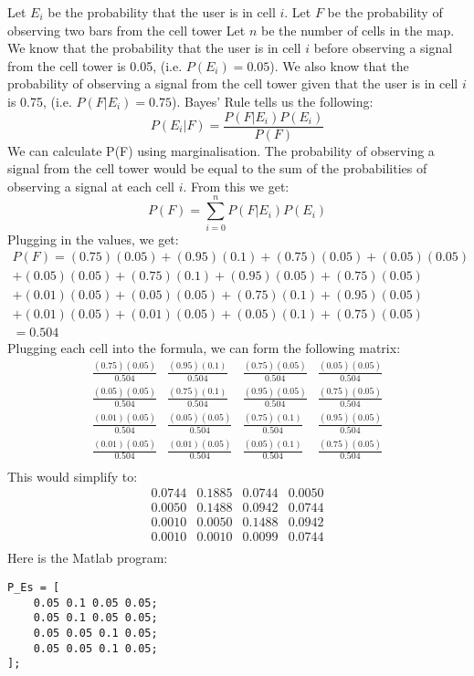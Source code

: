 \documentclass{oxmathproblems}
\begin{document}
\begin{questions}
\miquestion
Let $E_i$ be the probability that the user is in cell $i$.
\newline
Let $F$ be the probability of observing two bars from the cell tower
\newline
Let $n$ be the number of cells in the map.
\newline
\newline
We know that the probability that the user is in cell $i$ before observing a signal from the cell tower is 0.05, (i.e. $P(E_i)=0.05$). We also know that the probability of observing a signal from the cell tower given that the user is in cell $i$ is 0.75, (i.e. $P(F|E_i)=0.75$).
\newline
\newline
Bayes' Rule tells us the following:
$$P(E_i|F)=\frac{P(F|E_i)P(E_i)}{P(F)}$$
We can calculate P(F) using marginalisation. The probability of observing a signal from the cell tower would be equal to the sum of the probabilities of observing a signal at each cell $i$. From this we get:
$$P(F)=\sum_{i=0}^{n}P(F|E_i)P(E_i)$$
\newpage
Plugging in the values, we get:
\begin{align*}
    P(F)=(0.75)(0.05)+(0.95)(0.1)+(0.75)(0.05)+(0.05)(0.05)\\
        +(0.05)(0.05)+(0.75)(0.1)+(0.95)(0.05)+(0.75)(0.05)\\
        +(0.01)(0.05)+(0.05)(0.05)+(0.75)(0.1)+(0.95)(0.05)\\
        +(0.01)(0.05)+(0.01)(0.05)+(0.05)(0.1)+(0.75)(0.05)\\
        =0.504
\end{align*}
Plugging each cell into the formula, we can form the following matrix:
$$
\begin{matrix}
    \frac{(0.75)(0.05)}{0.504}&\frac{(0.95)(0.1)}{0.504}&\frac{(0.75)(0.05)}{0.504}&\frac{(0.05)(0.05)}{0.504}\\
    \frac{(0.05)(0.05)}{0.504}&\frac{(0.75)(0.1)}{0.504}&\frac{(0.95)(0.05)}{0.504}&\frac{(0.75)(0.05)}{0.504}\\
    \frac{(0.01)(0.05)}{0.504}&\frac{(0.05)(0.05)}{0.504}&\frac{(0.75)(0.1)}{0.504}&\frac{(0.95)(0.05)}{0.504}\\
    \frac{(0.01)(0.05)}{0.504}&\frac{(0.01)(0.05)}{0.504}&\frac{(0.05)(0.1)}{0.504}&\frac{(0.75)(0.05)}{0.504}\\
\end{matrix}
$$
This would simplify to:
$$
\begin{matrix}
    0.0744&0.1885&0.0744&0.0050\\
    0.0050&0.1488&0.0942&0.0744\\
    0.0010&0.0050&0.1488&0.0942\\
    0.0010&0.0010&0.0099&0.0744\\
\end{matrix}
$$
Here is the Matlab program:
\begin{verbatim}
P_Es = [
    0.05 0.1 0.05 0.05;
    0.05 0.1 0.05 0.05;
    0.05 0.05 0.1 0.05;
    0.05 0.05 0.1 0.05;
];


\end{verbatim}
\end{questions}
\end{document}
